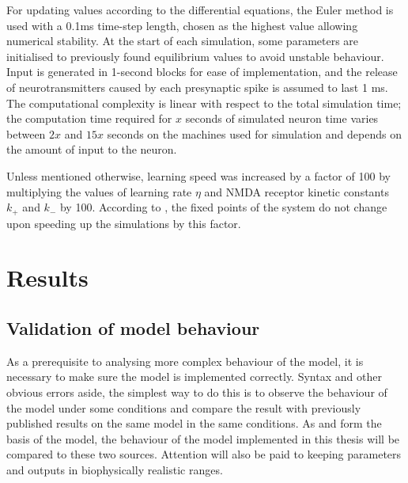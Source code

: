 \documentclass[a4paper,12pt]{report}
\theoremstyle{definition}
\begin{document}
For updating values according to the differential equations, the Euler method is used with a 0.1ms time-step length, chosen as the highest value allowing numerical stability. At the start of each simulation, some parameters are initialised to previously found equilibrium values to avoid unstable behaviour. Input is generated in 1-second blocks for ease of implementation, and the release of neurotransmitters caused by each presynaptic spike is assumed to last 1 ms. The computational complexity is linear with respect to the total simulation time; the computation time required for $x$ seconds of simulated neuron time varies between $2x$ and $15x$ seconds on the machines used for simulation and depends on the amount of input to the neuron.

Unless mentioned otherwise, learning speed was increased by a factor of 100 by multiplying the values of learning rate $\eta$ and NMDA receptor kinetic constants $k_+$ and $k_-$ by 100. According to \cite{yeung2004synaptic}, the fixed points of the system do not change upon speeding up the simulations by this factor.











\chapter{Results}

\section{Validation of model behaviour}

As a prerequisite to analysing more complex behaviour of the model, it is necessary to make sure the model is implemented correctly. Syntax and other obvious errors aside, the simplest way to do this is to observe the behaviour of the model under some conditions and compare the result with previously published results on the same model in the same conditions. As \cite{shouval2002unified} and \cite{yeung2004synaptic} form the basis of the model, the behaviour of the model implemented in this thesis will be compared to these two sources. Attention will also be paid to keeping parameters and outputs in biophysically realistic ranges.
\end{document}
